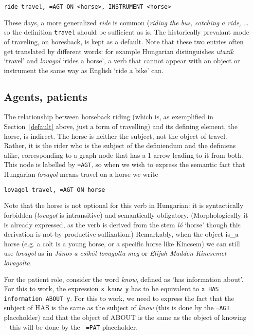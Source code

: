 \documentclass[11pt,bookmarks,bookmarksnumbered,naturalnames,plainpages=false,pdftex,colorlinks=true,urlcolor=blue,bookmarksdepth=subsection,plainpages=false]{paper}
\begin{document}
\begin{verbatim}
ride travel, =AGT ON <horse>, INSTRUMENT <horse>
\end{verbatim}

\noindent
These days, a more generalized {\it ride} is common ({\it riding the bus,
  catching a ride, \ldots} so the definition {\tt travel} should be sufficient
as is. The historically prevalant mode of traveling, on horesback, is kept as
a default. Note that these two entries often get translated by different
words: for example Hungarian distinguishes {\it utazik} `travel' and {\it
  lovagol} `rides a horse', a verb that cannot appear with an object or
instrument the same way as English `ride a bike' can.  

\subsection{Agents, patients}\label{agtpat}

The relationship between horseback riding (which is, as exemplified in
Section~\ref{default} above, just a form of travelling) and its defining
element, the horse, is indirect. The horse is neither the subject, not the
object of travel.  Rather, it is the rider who is the subject of the
definiendum and the definiens alike, corresponding to a graph node that has a
1 arrow leading to it from both. This node is labelled by {\tt =AGT}, so when
we wish to express the semantic fact that Hungarian {\it lovagol} means travel
on a horse we write

\begin{verbatim}
lovagol travel, =AGT ON horse
\end{verbatim} 

\noindent
Note that the horse is not optional for this verb in Hungarian: it is
syntactically forbidden ({\it lovagol} is intransitive) and semantically
obligatory. (Morphologically it is already expressed, as the verb is derived
from the stem {\it l\'o} `horse' though this derivation is not by productive
suffixation.) Remarkably, when the object is\_a horse (e.g. a colt is a young
horse, or a specific horse like Kincsem) we can still use {\it lovagol} as in
{\it J\'anos a csik\'ot lovagolta meg} or {\it Elijah Madden Kincsemet
  lovagolta}.

For the patient role, consider the word {\it know}, defined as `has
information about'. For this to work, the expression {\tt x know y} has to be
equivalent to {\tt x HAS information ABOUT y}. For this to work, we need to
express the fact that the subject of HAS is the same as the subject of {\it
  know} (this is done by the {\tt =AGT} placeholder) and that the object of
ABOUT is the same as the object of knowing -- this will be done by the {\tt
  =PAT} placeholder. 
\end{document}
